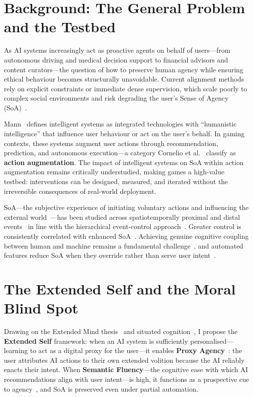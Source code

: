 \documentclass[runningheads]{llncs}
\begin{document}
\section{Background: The General Problem and the Testbed}

As AI systems increasingly act as proactive agents on behalf of
users---from autonomous driving and medical decision support to financial
advisors and content curators---the question of how to preserve human agency
while ensuring ethical behaviour becomes structurally unavoidable. Current
alignment methods rely on explicit constraints or immediate dense supervision,
which scale poorly to complex social environments and risk degrading the
user's Sense of Agency (SoA)~\cite{neufeld22}.

Mann~\cite{mann98} defines intelligent systems as integrated technologies with
``humanistic intelligence'' that influence user behaviour or act on the user's
behalf. In gaming contexts, these systems augment user actions through
recommendation, prediction, and autonomous execution---a category Cornelio et
al.~\cite{cornelio22} classify as \textbf{action augmentation}. The impact of
intelligent systems on SoA within action augmentation remains critically
understudied, making games a high-value testbed: interventions can be designed,
measured, and iterated without the irreversible consequences of real-world
deployment.

SoA---the subjective experience of initiating voluntary actions and influencing
the external world~\cite{pacherie11}---has been studied across spatiotemporally
proximal and distal events~\cite{kumar14,kumar17} in line with the hierarchical
event-control approach~\cite{jordan03}. Greater control is consistently
correlated with enhanced SoA~\cite{chambon12,chambon14,sidarus17}. Achieving
genuine cognitive coupling between human and machine remains a fundamental
challenge~\cite{berberian19}, and automated features reduce SoA when they
override rather than serve user intent~\cite{lukoff21}.

\section{The Extended Self and the Moral Blind Spot}

Drawing on the Extended Mind thesis~\cite{clark98} and situated
cognition~\cite{lave91}, I propose the \textbf{Extended Self} framework: when
an AI system is sufficiently personalised---learning to act as a digital proxy
for the user---it enables \textbf{Proxy Agency}~\cite{bandura01}: the user
attributes AI actions to their own extended volition because the AI reliably
enacts their intent. When \textbf{Semantic Fluency}---the cognitive ease with
which AI recommendations align with user intent---is high, it functions as a
prospective cue to agency~\cite{chambon12,wenke10,sidarus17}, and SoA is
preserved even under partial automation.
\end{document}
